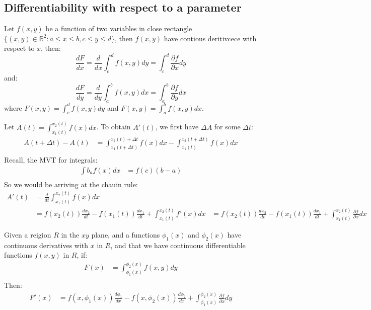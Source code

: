 \documentclass[11pt]{article}
\begin{document}
\subsection{Differentiability with respect to a parameter}
\begin{theorem}
    Let $f(x, y)$ be a function of two variables in close rectangle $\{(x,y) \in \mathbb{R}^2: a \leq x \leq b, c \leq y \leq d\}$, then $f(x, y)$ have contious deritivcece with respect to $x$, then:
    $$ \frac{dF}{dx} = \frac{d}{dx}\int^d_c f(x, y) dy = \int^d_c \frac{\partial f}{\partial x} dy$$
    and:
    $$ \frac{dF}{dy} = \frac{d}{dy}\int^b_a f(x, y) dx = \int^b_a \frac{\partial f}{\partial y} dx$$
    where $F(x,y) = \int^d_c f(x, y) dy$ and $F(x,y) = \int^b_a f(x, y) dx$.
\end{theorem}
\begin{example}
    Let $A(t) = \int_{x_1(t)}^{x_2(t)} f(x) dx$. To obtain $A'(t)$, we first have $\Delta A$ for some $\Delta t$:
    \begin{align*}
        A(t + \Delta t) - A(t) &= \int_{x_1(t + \Delta t)}^{x_2(t) + \Delta t} f(x) dx - \int_{x_1(t)}^{x_2(t+ \Delta t)} f(x) dx \\
    \end{align*}
    Recall, the MVT for integrals:
    \begin{align*}
        \int b_ a f(x) dx &= f(c)(b-a) \\
    \end{align*}
    So we would be arriving at the chauin rule:
    \begin{align*}
        A'(t) &= \frac{d}{dt} \int_{x_1(t)}^{x_2(t)} f(x) dx \\
        &= f(x_2(t))\frac{dx_2}{dt} - f(x_1(t))\frac{dx_1}{dt} + \int_{x_1(t)}^{x_2(t)} f'(x) dx
        &= f(x_2(t))\frac{dx_2}{dt} - f(x_1(t))\frac{dx_1}{dt} + \int_{x_1(t)}^{x_2(t)} \frac{\partial f}{\partial x} dx
    \end{align*}
\end{example}
\begin{theorem}
    Given a reigion $R$ in the $xy$ plane, and a functions $\phi_1(x)$ and $\phi_2(x)$ have continuous derivatives with $x$ in $R$, and that we have continuous differentiable functions $f(x, y)$ in $R$, if:
    \begin{align*}
       F(x) &= \int_{\phi_1(x)}^{\phi_2(x)} f(x, y) dy \\
    \end{align*}
    Then:
    \begin{align*}
        F'(x) &= f(x, \phi_1(x))\frac{d\phi_1}{dx} - f(x, \phi_2(x))\frac{d\phi_2}{dx} + \int_{\phi_1(x)}^{\phi_2(x)} \frac{\partial f}{\partial x} dy
    \end{align*}
\end{theorem}
\end{document}
